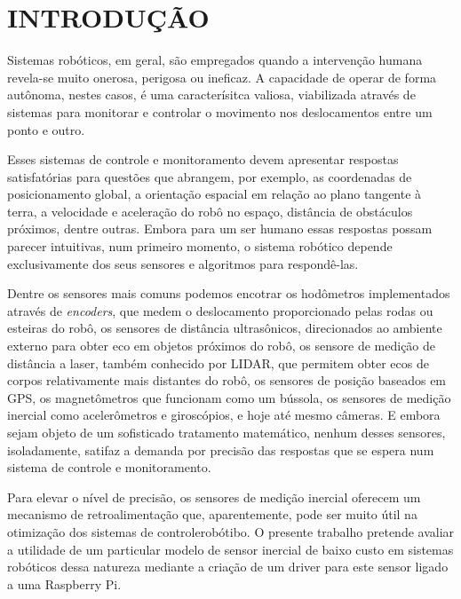 \chapter{INTRODUÇÃO}
\label{chap:introducao}

Sistemas robóticos, em geral, são empregados quando a intervenção humana
revela-se muito onerosa, perigosa ou ineficaz. A capacidade de operar de forma
autônoma, nestes casos, é uma caracterísitca valiosa, viabilizada através de
sistemas para monitorar e controlar o movimento nos deslocamentos entre um
ponto e outro.

Esses sistemas de controle e monitoramento devem apresentar respostas
satisfatórias para questões que abrangem, por exemplo, as coordenadas de
posicionamento global, a orientação espacial em relação ao plano tangente à
terra, a velocidade e aceleração do robô no espaço, distância de obstáculos
próximos, dentre outras. Embora para um ser humano essas respostas possam
parecer intuitivas, num primeiro momento, o sistema robótico depende
exclusivamente dos seus sensores e algoritmos para respondê-las.

Dentre os sensores mais comuns podemos encotrar os hodômetros implementados
através de \emph{encoders}, que medem o deslocamento proporcionado pelas
rodas ou esteiras do robô, os sensores de distância ultrasônicos, direcionados
ao ambiente externo para obter eco em objetos próximos do robô, os sensore de
medição de distância a laser, também conhecido por LIDAR, que permitem obter
ecos de corpos relativamente mais distantes do robô, os sensores de posição
baseados em GPS, os magnetômetros que funcionam como um bússola, os sensores de
medição inercial como acelerômetros e giroscópios, e hoje até mesmo câmeras. E
embora sejam objeto de um sofisticado tratamento matemático, nenhum desses
sensores, isoladamente, satifaz a demanda por precisão das respostas que se
espera num sistema de controle e monitoramento.

Para elevar o nível de precisão, os sensores de medição inercial oferecem um
mecanismo de retroalimentação que, aparentemente, pode ser muito útil na
otimização dos sistemas de controlerobótibo. O presente trabalho pretende
avaliar a utilidade de um particular modelo de sensor inercial de baixo custo
em sistemas robóticos dessa natureza mediante a criação de um driver para este
sensor ligado a uma Raspberry Pi.

